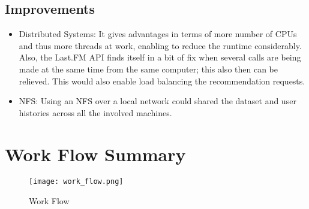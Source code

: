 		\subsection{Improvements}
\begin{itemize}
	\item Distributed Systems: It gives advantages in terms of more number of CPUs and thus more threads at work, enabling to reduce the runtime considerably. Also, the Last.FM API finds itself in a bit of fix when several calls are being made at the same time from the same computer; this also then can be relieved. This would also enable load balancing the recommendation requests.
	\item NFS: Using an NFS over a local network could shared the dataset and user histories across all the involved machines.
\end{itemize}

	\section{Work Flow Summary}
		\begin{figure}[h!]
			\centering
			\texttt{[image: work\_flow.png]}
			\caption{Work Flow\label{work_flow}}
		\end{figure}
			